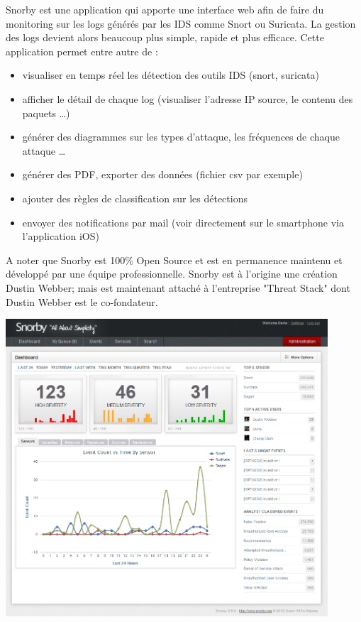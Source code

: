 \documentclass[a4paper,11pt,french]{article}
\begin{document}
Snorby est une application qui apporte une interface web afin de faire du monitoring sur les logs générés par les IDS comme Snort ou Suricata. La gestion des logs devient alors beaucoup plus simple, rapide et plus efficace. Cette application permet entre autre de :
\begin{itemize}
	\item visualiser en temps réel les détection des outils IDS (snort, suricata)
	\item afficher le détail de chaque log (visualiser l’adresse IP source, le contenu des paquets …)
	\item générer des diagrammes sur les types d’attaque, les fréquences de chaque attaque …
	\item générer des PDF, exporter des données (fichier csv par exemple)
	\item ajouter des règles de classification sur les détections
	\item envoyer des notifications par mail (voir directement sur le smartphone via l’application iOS)
\end{itemize}
A noter que Snorby est 100\% Open Source et est en permanence maintenu et développé par une équipe professionnelle. Snorby est à l’origine une création Dustin Webber; mais est maintenant attaché à l’entreprise "Threat Stack" dont Dustin Webber est le co-fondateur.

\begin{center}
\includegraphics[width=12cm]{icons/Snorby.png}
\end{center}
\end{document}

